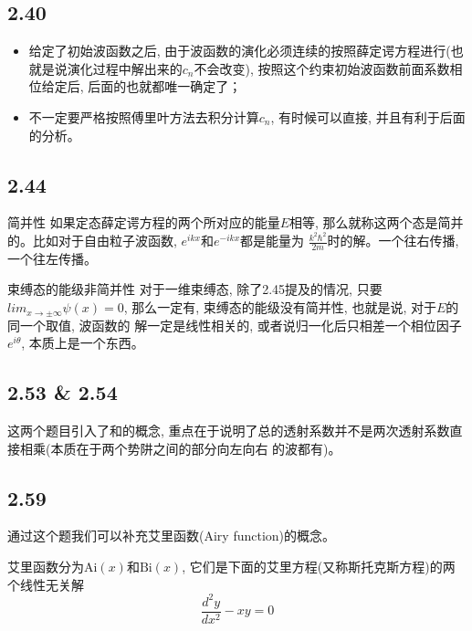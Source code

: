 \documentclass[a4paper,zihao=-4,linespread=1]{ctexrep}
\begin{document}
    \subsection*{2.40}
    \begin{itemize}
        \item 给定了初始波函数之后, 由于波函数的演化必须连续的按照薛定谔方程进行(也就是说演化过程中解出来的$c_n$不会改变), 按照这个约束初始波函数前面系数相位给定后, 后面的也就都唯一确定了；
        \item 不一定要严格按照傅里叶方法去积分计算$c_n$, 有时候可以直接, 并且有利于后面的分析。
    \end{itemize}
    \subsection*{2.44}
    \begin{define}{简并性}
        如果定态薛定谔方程的两个所对应的能量$E$相等, 那么就称这两个态是简并的。比如对于自由粒子波函数, $e^{ikx}$和$e^{-ikx}$都是能量为
        $\frac{k^2\hbar^2}{2m}$时的解。一个往右传播, 一个往左传播。
    \end{define}
    \begin{theorem}{束缚态的能级非简并性}
        对于一维束缚态, 除了2.45提及的情况, 只要$lim_{x\to\pm\infty}\psi(x)=0$, 那么一定有, 束缚态的能级没有简并性, 也就是说, 对于$E$的同一个取值, 波函数的
        解一定是线性相关的, 或者说归一化后只相差一个相位因子$e^{i\theta}$, 本质上是一个东西。
    \end{theorem}
    \subsection*{2.53 \& 2.54}
    这两个题目引入了和的概念, 重点在于说明了总的透射系数并不是两次透射系数直接相乘(本质在于两个势阱之间的部分向左向右
    的波都有)。
    \subsection*{2.59}
    通过这个题我们可以补充艾里函数(Airy function)的概念。

    艾里函数分为$\mathrm{Ai}(x)$和$\mathrm{Bi}(x)$, 它们是下面的艾里方程(又称斯托克斯方程)的两个线性无关解
    $$\frac{d^2y}{dx^2}-xy=0$$
\end{document}
